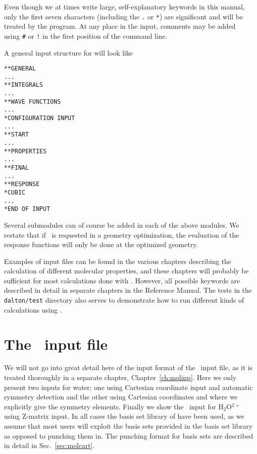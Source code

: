 Even though we at times write large, self-explanatory keywords in this
manual, only the first seven characters (including the \verb|.| or
\verb|*|) are significant and will be
treated by the program. At any
place in the input, comments may be added using
\verb|#| or \verb|!|
in the first position of the command line.

A general input structure for {\dalton} will look like

\begin{verbatim}
**GENERAL
...
**INTEGRALS
...
**WAVE FUNCTIONS
...
*CONFIGURATION INPUT
...
**START
...
**PROPERTIES
...
**FINAL
...
**RESPONSE
*CUBIC
...
*END OF INPUT
\end{verbatim}

Several submodules can of course be added in each of the above
modules. We restate that if \resp\ is requested in a geometry
optimization, the evaluation of the response functions will only be
done at the optimized geometry.

Examples of input files can be found in the various chapters
describing the calculation of different molecular properties, and
these chapters will probably be sufficient for most calculations done
with {\dalton}. However, all possible keywords are described in detail
in separate chapters in the Reference Manual. The tests in the
\verb|dalton/test| directory also serves to demonstrate how to run
different kinds of calculations using {\dalton}.

\section{The \mol\ input file}

We will not go into great detail here of the input format of the \mol\ input
file, as it is treated thoroughly in a separate chapter,
Chapter~\ref{ch:molinp}. Here we only present two inputs for
water; one
using Cartesian coordinate input and
automatic symmetry detection and
the other using Cartesian coordinates and where we explicitly give the
symmetry elements. Finally we show the \mol\ input for H$_{2}$O$^{2+}$
using Z-matrix input. In
all cases the basis set library of {\dalton} have been used, as we
assume that most users will exploit the basis sets provided in the basis
set library as opposed to punching them in. The punching
format for basis sets are described in detail in Sec.~\ref{sec:molcart}.

